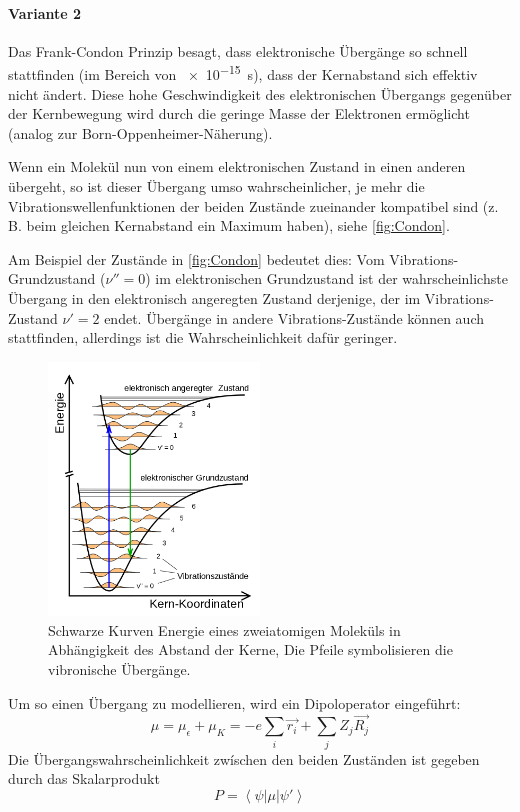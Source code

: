 \paragraph{Variante 2}

Das Frank-Condon Prinzip besagt, dass elektronische Übergänge so schnell stattfinden (im Bereich von \SI{e-15}{s}), dass der Kernabstand sich effektiv nicht ändert.
Diese hohe Geschwindigkeit des elektronischen Übergangs gegenüber der Kernbewegung wird durch die geringe Masse der Elektronen ermöglicht (analog zur Born-Oppenheimer-Näherung).

Wenn ein Molekül nun von einem elektronischen Zustand in einen anderen übergeht, so ist dieser Übergang umso wahrscheinlicher, je mehr die Vibrationswellenfunktionen der beiden Zustände zueinander kompatibel sind (z. B. beim gleichen Kernabstand ein Maximum haben), siehe \autoref{fig:Condon}.

Am Beispiel der Zustände in \autoref{fig:Condon} bedeutet dies: Vom Vibrations-Grundzustand ($\nu'' = 0$) im elektronischen Grundzustand ist der wahrscheinlichste Übergang in den elektronisch angeregten Zustand derjenige, der im Vibrations-Zustand $\nu' = 2$ endet. Übergänge in andere Vibrations-Zustände können auch stattfinden, allerdings ist die Wahrscheinlichkeit dafür geringer.


\begin{figure}[H]
    \centering
    \includegraphics[width = 0.5\textwidth]{resources/09-05-2012/Franck-Condon-Prinzip}
    \caption{Schwarze Kurven Energie eines zweiatomigen Moleküls in Abhängigkeit des Abstand der Kerne, Die Pfeile symbolisieren die vibronische Übergänge.}
    \label{fig:Condon}
\end{figure}


Um so einen Übergang zu modellieren, wird ein Dipoloperator eingeführt:
\begin{equation}
    \mu = \mu_{\epsilon} + \mu_K = - e \sum_{i} \vec{r_i}  + \sum_{j} Z_j \vec{R_j} 
\end{equation}
Die Übergangswahrscheinlichkeit zwíschen den beiden Zuständen ist gegeben durch das Skalarprodukt
\begin{equation}
    P = \left\langle\psi| \mu | \psi' \right\rangle   
\end{equation}

